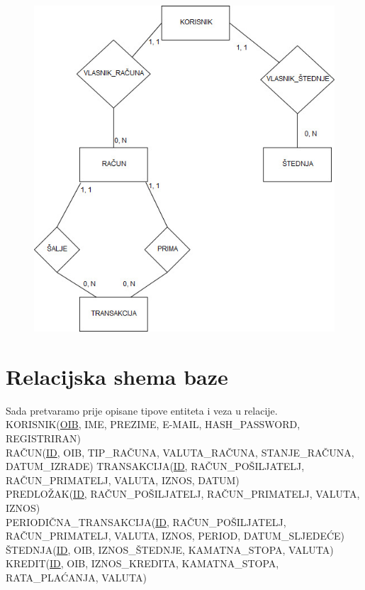 \documentclass{article}
\begin{document}
\newpage

\begin{figure}[H]
\centering
\includegraphics[width=1\textwidth]{er.jpg}
\end{figure}

\newpage

\section{Relacijska shema baze}
Sada pretvaramo prije opisane tipove entiteta i veza u relacije. \\

KORISNIK(\underline{OIB}, IME, PREZIME, E-MAIL, HASH\_PASSWORD, REGISTRIRAN)\\
RA\v{C}UN(\underline{ID}, OIB, TIP\_RA\v{C}UNA, VALUTA\_RA\v{C}UNA, STANJE\_RA\v{C}UNA, DATUM\_IZRADE)
TRANSAKCIJA(\underline{ID}, RA\v{C}UN\_PO\v{S}ILJATELJ, RA\v{C}UN\_PRIMATELJ, VALUTA, IZNOS, DATUM)\\
PREDLO\v{Z}AK(\underline{ID}, RA\v{C}UN\_PO\v{S}ILJATELJ, RA\v{C}UN\_PRIMATELJ, VALUTA, IZNOS)\\
PERIODI\v{C}NA\_TRANSAKCIJA(\underline{ID}, RA\v{C}UN\_PO\v{S}ILJATELJ, RA\v{C}UN\_PRIMATELJ, VALUTA, IZNOS, PERIOD, DATUM\_SLJEDE\'{C}E)\\
\v{S}TEDNJA(\underline{ID}, OIB, IZNOS\_\v{S}TEDNJE, KAMATNA\_STOPA, VALUTA) \\
KREDIT(\underline{ID}, OIB, IZNOS\_KREDITA, KAMATNA\_STOPA, RATA\_PLA\'{C}ANJA, VALUTA) \\
\end{document}
